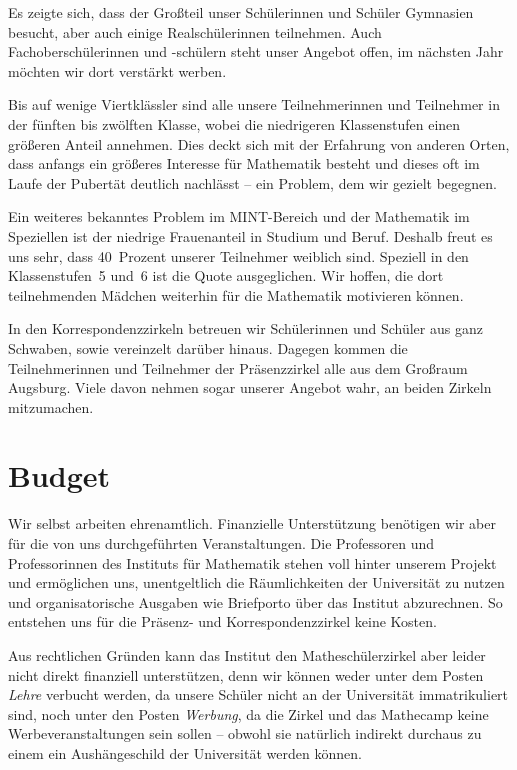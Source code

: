 \documentclass[12pt]{zettel}
\begin{document}
Es zeigte sich, dass der Großteil unser Schülerinnen und
Schüler Gymnasien besucht, aber auch einige Realschülerinnen teilnehmen.
Auch Fachoberschülerinnen und -schülern steht unser Angebot offen, im nächsten
Jahr möchten wir dort verstärkt werben.

Bis auf wenige Viertklässler sind alle unsere Teilnehmerinnen und
Teilnehmer in der fünften bis zwölften Klasse, wobei die niedrigeren
Klassenstufen einen größeren Anteil annehmen. Dies deckt sich mit der
Erfahrung von anderen Orten, dass anfangs ein größeres Interesse für
Mathematik besteht und dieses oft im Laufe der Pubertät
deutlich nachlässt -- ein Problem, dem wir gezielt begegnen.

Ein weiteres bekanntes Problem im MINT-Bereich
und der Mathematik im Speziellen ist der niedrige Frauenanteil in
Studium und Beruf. Deshalb freut es uns sehr, dass 40~Prozent unserer
Teilnehmer weiblich sind. Speziell in den Klassenstufen~5 und~6 ist die Quote
ausgeglichen. Wir hoffen, die dort teilnehmenden Mädchen weiterhin für die
Mathematik motivieren können.

In den Korrespondenzzirkeln betreuen wir Schülerinnen und Schüler aus ganz
Schwaben, sowie vereinzelt darüber hinaus. Dagegen kommen die Teilnehmerinnen
und Teilnehmer der Präsenzzirkel alle aus dem Großraum Augsburg. Viele davon
nehmen sogar unserer Angebot wahr, an beiden Zirkeln mitzumachen.


\section{Budget}

Wir selbst arbeiten ehrenamtlich. Finanzielle Unterstützung benötigen wir aber
für die von uns durchgeführten Veranstaltungen. Die Professoren und
Professorinnen des Instituts für Mathematik stehen voll hinter unserem Projekt
und ermöglichen uns, unentgeltlich die Räumlichkeiten der Universität zu nutzen
und organisatorische Ausgaben wie Briefporto über das Institut abzurechnen.
So entstehen uns für die Präsenz- und Korrespondenzzirkel keine Kosten.

Aus rechtlichen Gründen kann das Institut den Matheschülerzirkel aber leider nicht
direkt finanziell unterstützen, denn wir können weder unter dem Posten
\emph{Lehre} verbucht werden, da unsere Schüler nicht an der Universität
immatrikuliert sind, noch unter den Posten \emph{Werbung}, da die Zirkel und
das Mathecamp keine Werbeveranstaltungen sein sollen -- obwohl sie natürlich indirekt
durchaus zu einem ein Aushängeschild der Universität werden können.
\end{document}
